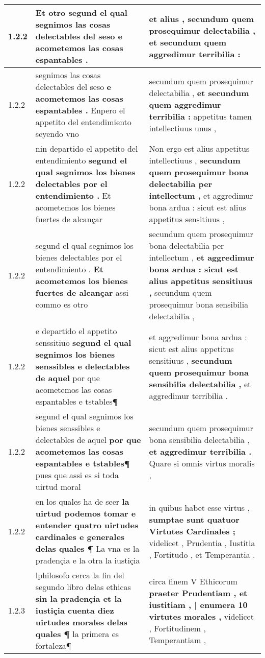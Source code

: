 \begin{tabular}{|p{1cm}|p{6.5cm}|p{6.5cm}|}
1.2.2 & Et otro segund el qual \textbf{ segnimos las cosas delectables del seso } e acometemos las cosas espantables . & et alius , \textbf{ secundum quem prosequimur delectabilia , } et secundum quem aggredimur terribilia : \\\hline
1.2.2 & segnimos las cosas delectables del seso \textbf{ e acometemos las cosas espantables . } Enpero el appetito del entendimiento seyendo vno & secundum quem prosequimur delectabilia , \textbf{ et secundum quem aggredimur terribilia : } appetitus tamen intellectiuus unus , \\\hline
1.2.2 & nin departido el appetito del entendimiento \textbf{ segund el qual segnimos los bienes delectables por el entendimiento . } Et acometemos los bienes fuertes de alcançar & Non ergo est alius appetitus intellectiuus , \textbf{ secundum quem prosequimur bona delectabilia per intellectum , } et aggredimur bona ardua : sicut est alius appetitus sensitiuus , \\\hline
1.2.2 & segund el qual segnimos los bienes delectables por el entendimiento . \textbf{ Et acometemos los bienes fuertes de alcançar } assi commo es otro & secundum quem prosequimur bona delectabilia per intellectum , \textbf{ et aggredimur bona ardua : sicut est alius appetitus sensitiuus , } secundum quem prosequimur bona sensibilia delectabilia , \\\hline
1.2.2 & e departido el appetito senssitiuo \textbf{ segund el qual segnimos los bienes senssibles e delectables de aquel } por que acometemos las cosas espantables e tstables¶ & et aggredimur bona ardua : sicut est alius appetitus sensitiuus , \textbf{ secundum quem prosequimur bona sensibilia delectabilia , } et aggredimur terribilia . \\\hline
1.2.2 & segund el qual segnimos los bienes senssibles e delectables de aquel \textbf{ por que acometemos las cosas espantables e tstables¶ } pues que assi es si toda uirtud moral & secundum quem prosequimur bona sensibilia delectabilia , \textbf{ et aggredimur terribilia . } Quare si omnis virtus moralis , \\\hline
1.2.2 & en los quales ha de seer \textbf{ la uirtud podemos tomar e entender quatro uirtudes cardinales e generales delas quales ¶ } La vna es la pradençia e la otra la iustiçia & in quibus habet esse virtus , \textbf{ sumptae sunt quatuor Virtutes Cardinales ; } videlicet , Prudentia , Iustitia , Fortitudo , et Temperantia . \\\hline
1.2.3 & lphilosofo cerca la fin del segundo libro delas ethicas \textbf{ sin la pradençia et la iustiçia cuenta diez uirtudes morales delas quales ¶ } la primera es fortaleza¶ & circa finem V Ethicorum \textbf{ praeter Prudentiam , et iustitiam , | enumera 10 virtutes morales , } videlicet , Fortitudinem , Temperantiam , \\\hline

\end{tabular}
